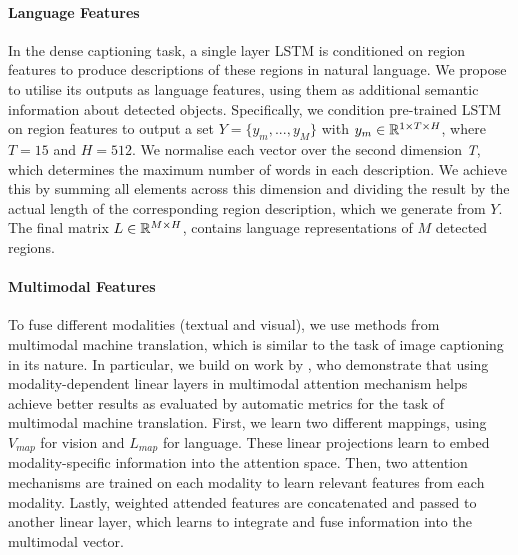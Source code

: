 \documentclass[11pt,a4paper]{article}
\newcommand{\kibitz}[2]{\ifnum\Comments=1\textcolor{#1}{#2}\fi}
\newcommand{\nikolai}[1]{\kibitz{red}   {[Nikolai: #1]}}
\newcommand{\R}{\mathbb{R}}
\begin{document}
\paragraph{Language Features}
In the dense captioning task, a single layer LSTM is conditioned on region features to produce descriptions of these regions in natural language.
We propose to utilise its outputs as language features, using them as additional semantic information about detected objects.
Specifically, we condition pre-trained LSTM on region features to output a set ${Y = \{y_m, ..., y_M\}}$ with $y_m \in \R\sp{1 \times T \times H}$, where $T=15$ and $H=512$.
We normalise each vector over the second dimension \textit{T}, which determines the maximum number of words in each description.
We achieve this by summing all elements across this dimension and dividing the result by the actual length of the corresponding region description, which we generate from $Y$.
The final matrix $L \in \R\sp{M \times H}$, contains language representations of $M$ detected regions.


\paragraph{Multimodal Features}
To fuse different modalities (textual and visual), we use methods from multimodal machine translation, which is similar to the task of image captioning in its nature.
In particular, we build on work by , who demonstrate that using modality-dependent linear layers in multimodal attention mechanism helps achieve better results as evaluated by automatic metrics for the task of multimodal machine translation.
First, we learn two different mappings, using $V_{map}$ for vision and $L_{map}$ for language.
These linear projections learn to embed modality-specific information into the attention space.
Then, two attention mechanisms are trained on each modality to learn relevant features from each modality.
Lastly, weighted attended features are concatenated and passed to another linear layer, which learns to integrate and fuse information into the multimodal vector.
\end{document}
